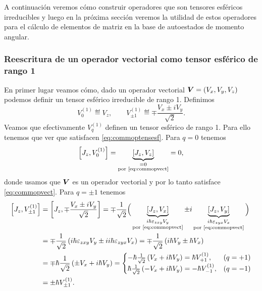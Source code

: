\documentclass[10pt, a4paper]{article}
\numberwithin{equation}{subsection}
\begin{document}
A continuación veremos cómo construir operadores que son tensores esféricos
irreducibles y luego en la próxima sección veremos la utilidad de estos
operadores para el cálculo de elementos de matriz en la base de autoestados de
momento angular.

\subsubsection{Reescritura de un operador vectorial como tensor esférico de
  rango 1}

En primer lugar veamos cómo, dado un operador vectorial $\vb*{V} = (V_x, V_y,
V_z)$ podemos definir un tensor esférico irreducible de rango 1.  Definimos
\begin{equation} \label{eq:defvecttensone}
  V^{(1)}_{0} \eqdef V_z, \qquad V^{(1)}_{\pm1} \eqdef \mp\frac{V_x \pm
    iV_y}{\sqrt{2}}.
\end{equation}
Veamos que efectivamente $V^{(1)}_q$ definen un tensor esférico de rango 1.
Para ello tenemos que ver que satisfacen \eqref{eq:commoptensesf}.
Para $q = 0$ tenemos
\begin{equation}
  \comm{J_z}{V^{(1)}_{0}} = \underbrace{\comm{J_z}{V_z}}_{\substack{= 0 \\
    \text{por \eqref{eq:commopvect}}}} = 0,
\end{equation}
donde usamos que $\vb*{V}$ es un operador vectorial y por lo tanto satisface
\eqref{eq:commopvect}.
Para $q = \pm1$ tenemos
\begin{align}
  \comm{J_z}{V^{(1)}_{\pm1}} &= \comm{J_z}{\mp\frac{V_x \pm iV_y}{\sqrt{2}}}
    = \mp\frac{1}{\sqrt{2}}\Big(
      \underbrace{\comm{J_z}{V_x}}_{\substack{i\hbar\lchivita_{zxy}V_y \\
        \text{por \eqref{eq:commopvect}}}}
      \pm i
      \underbrace{\comm{J_z}{V_y}}_{\substack{i\hbar\lchivita_{zyx}V_x \\
      \text{por \eqref{eq:commopvect}}}}
      \Big)
    \nonumber \\
  &= \mp\frac{1}{\sqrt{2}}\left(i\hbar\lchivita_{zxy}V_y \pm
    ii\hbar\lchivita_{zyx}V_x\right)
    = \mp\frac{1}{\sqrt{2}}\left(i\hbar V_y \pm \hbar V_x\right) \nonumber \\
  &= \mp\hbar\frac{1}{\sqrt{2}}\left(\pm V_x + i\hbar V_y\right)
    = \begin{cases}
      -\hbar\frac{1}{\sqrt{2}}\left(V_x + i\hbar V_y\right) = \hbar
        V^{(1)}_{+1}, & (q = +1) \\
      \hbar\frac{1}{\sqrt{2}}\left(-V_x + i\hbar V_y\right) = -\hbar
      V^{(1)}_{-1}, & (q = -1) \\
    \end{cases} \nonumber \\
  &= \pm\hbar V^{(1)}_{\pm1}.
\end{align}
\end{document}
